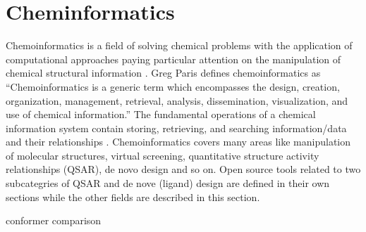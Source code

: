\section{Cheminformatics}
  
  Chemoinformatics is a field of solving chemical problems with the application of computational approaches paying particular attention on the manipulation of chemical structural information \cite{Leach_2007} . Greg Paris defines chemoinformatics as “Chemoinformatics is a generic term which encompasses the design, creation, organization, management, retrieval, analysis, dissemination, visualization, and use of chemical information.” The fundamental operations of a chemical information system contain storing, retrieving, and searching information/data and their relationships \cite{Gasteiger_2003}\cite{2003}. Chemoinformatics covers many areas like manipulation of molecular structures, virtual screening, quantitative structure activity relationships (QSAR), de novo design and so on. Open source tools related to two subcategries of QSAR and de nove (ligand) design are defined in their own sections while the other fields are described in this section.
  
  conformer comparison \cite{Ebejer_2012}